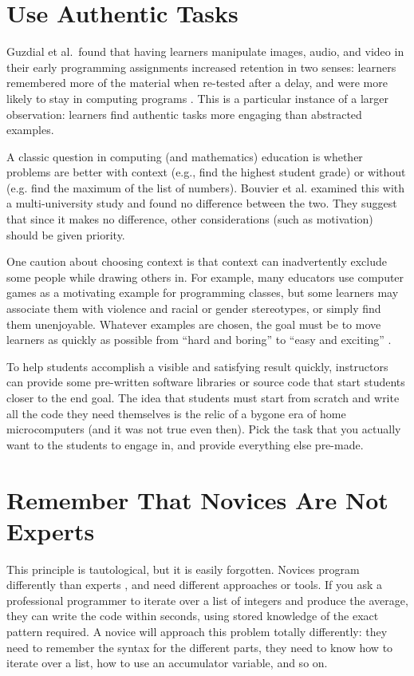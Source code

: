 \section*{Use Authentic Tasks}

Guzdial et al.\ found that having learners manipulate images, audio,
and video in their early programming assignments increased retention
in two senses: learners remembered more of the material when re-tested
after a delay, and were more likely to stay in computing programs
\cite{Guzd2013}.  This is a particular instance of a larger
observation: learners find authentic tasks more engaging than
abstracted examples.

A classic question in computing (and mathematics) education is whether
problems are better with context (e.g., find the highest student
grade) or without (e.g. find the maximum of the list of numbers).
Bouvier et al. \cite{Bouv2016} examined this with a
multi-university study and found no difference between the two.  They
suggest that since it makes no difference, other considerations (such
as motivation) should be given priority.

One caution about choosing context is that context can inadvertently
exclude some people while drawing others in.  For example, many
educators use computer games as a motivating example for programming
classes, but some learners may associate them with violence and racial
or gender stereotypes, or simply find them unenjoyable.  Whatever
examples are chosen, the goal must be to move learners as quickly as
possible from ``hard and boring'' to ``easy and exciting''
\cite{Repe2017}.

To help students accomplish a visible and satisfying result quickly,
instructors can provide some pre-written software libraries or source
code that start students closer to the end goal.  The idea that
students must start from scratch and write all the code they need
themselves is the relic of a bygone era of home microcomputers (and it
was not true even then).  Pick the task that you actually want to the
students to engage in, and provide everything else pre-made.

\section*{Remember That Novices Are Not Experts}

This principle is tautological, but it is easily forgotten.  Novices
program differently than experts \cite{Parn2017}, and need different
approaches or tools.  If you ask a professional programmer to iterate
over a list of integers and produce the average, they can write the
code within seconds, using stored knowledge of the exact pattern
required.  A novice will approach this problem totally differently:
they need to remember the syntax for the different parts, they need to
know how to iterate over a list, how to use an accumulator variable,
and so on.

